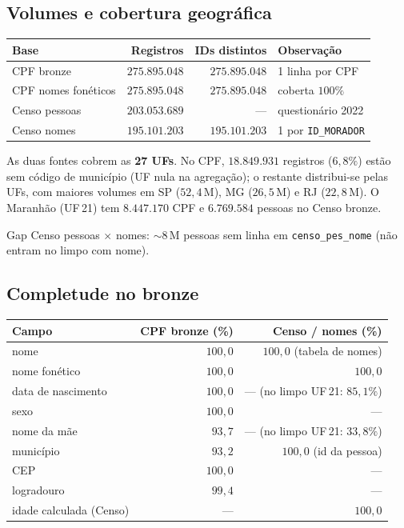 \documentclass[11pt,a4paper]{article}
\begin{document}
\subsection{Volumes e cobertura geográfica}

\begin{center}
\begin{tabular}{@{}lrrp{5.8cm}@{}}
\toprule
Base & Registros & IDs distintos & Observação \\
\midrule
CPF bronze & $275{.}895{.}048$ & $275{.}895{.}048$ & 1 linha por CPF \\
CPF nomes fonéticos & $275{.}895{.}048$ & $275{.}895{.}048$ & coberta $100\%$ \\
Censo pessoas & $203{.}053{.}689$ & --- & questionário 2022 \\
Censo nomes & $195{.}101{.}203$ & $195{.}101{.}203$ & 1 por \texttt{ID\_MORADOR} \\
\bottomrule
\end{tabular}
\end{center}

As duas fontes cobrem as \textbf{27 UFs}. No CPF, $18{.}849{.}931$ registros
($6{,}8\%$) estão sem código de município (UF nula na agregação); o restante
distribui-se pelas UFs, com maiores volumes em SP ($52{,}4$\,M), MG
($26{,}5$\,M) e RJ ($22{,}8$\,M). O Maranhão (UF\,21) tem $8{.}447{.}170$ CPF
e $6{.}769{.}584$ pessoas no Censo bronze.

Gap Censo pessoas $\times$ nomes: $\sim$8\,M pessoas sem linha em
\texttt{censo\_pes\_nome} (não entram no limpo com nome).

\subsection{Completude no bronze}

\begin{center}
\small
\begin{tabular}{@{}lrr@{}}
\toprule
Campo & CPF bronze (\%) & Censo / nomes (\%) \\
\midrule
nome & $100{,}0$ & $100{,}0$ (tabela de nomes) \\
nome fonético & $100{,}0$ & $100{,}0$ \\
data de nascimento & $100{,}0$ & --- (no limpo UF\,21: $85{,}1\%$) \\
sexo & $100{,}0$ & --- \\
nome da mãe & $93{,}7$ & --- (no limpo UF\,21: $33{,}8\%$) \\
município & $93{,}2$ & $100{,}0$ (id da pessoa) \\
CEP & $100{,}0$ & --- \\
logradouro & $99{,}4$ & --- \\
idade calculada (Censo) & --- & $100{,}0$ \\
\bottomrule
\end{tabular}
\end{center}
\end{document}
